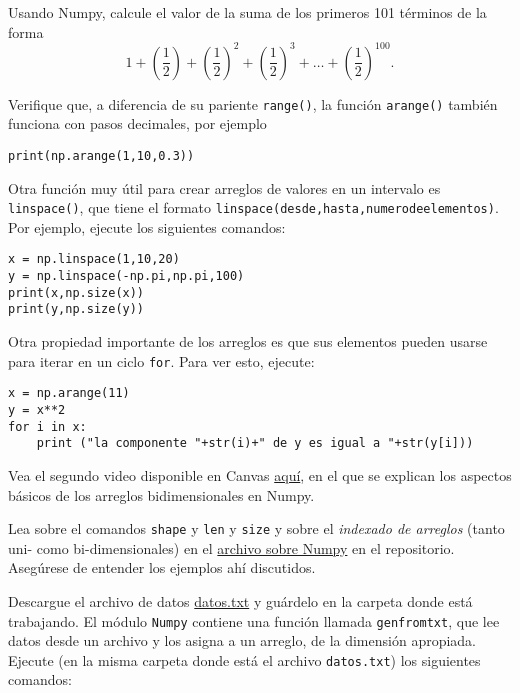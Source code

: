 \documentclass[11pt]{exam}
\begin{document}
\begin{questions}
\item Usando Numpy, calcule el valor de la suma de los primeros 101 términos de la forma
\begin{equation}
1+\left(\frac{1}{2}\right)+\left(\frac{1}{2}\right)^2+\left(\frac{1}{2}\right)^3+\dots +\left(\frac{1}{2}\right)^{100}.
\end{equation}
\item Verifique que, a diferencia de su pariente \texttt{range()}, la función \texttt{arange()} también funciona con pasos decimales, por ejemplo

\begin{verbatim}
print(np.arange(1,10,0.3))
\end{verbatim}

\item Otra función muy útil para crear arreglos de valores en un intervalo es \texttt{linspace()}, que tiene el formato \texttt{linspace(desde,hasta,numerodeelementos)}. Por ejemplo, ejecute los siguientes comandos:

\begin{verbatim}
x = np.linspace(1,10,20)
y = np.linspace(-np.pi,np.pi,100)
print(x,np.size(x))
print(y,np.size(y))
\end{verbatim}

\item Otra propiedad importante de los arreglos es que sus elementos pueden usarse para iterar en un ciclo \texttt{for}. Para ver esto, ejecute:

\begin{verbatim}
x = np.arange(11)
y = x**2
for i in x:
	print ("la componente "+str(i)+" de y es igual a "+str(y[i]))
\end{verbatim}

\item Vea el segundo video disponible en Canvas \href{https://udec.instructure.com/courses/51022/pages/numpy}{aquí}, en el que se explican los aspectos básicos de los arreglos bidimensionales en Numpy.
 
\item Lea sobre el comandos \texttt{shape} y \texttt{len} y \texttt{size} y sobre el\textit{ indexado de arreglos} (tanto uni- como bi-dimensionales) en el \href{https://github.com/gfrubi/CC/blob/master/Python/02-Numpy.ipynb}{archivo sobre Numpy} en el repositorio. Asegúrese de entender los ejemplos ahí discutidos.

\item Descargue el archivo de datos \href{https://udec.instructure.com/courses/51022/pages/numpy}{datos.txt} y guárdelo en la carpeta donde está trabajando. El módulo \texttt{Numpy} contiene una función llamada \texttt{genfromtxt}, que lee datos desde un archivo y los asigna a un arreglo, de la dimensión apropiada. Ejecute (en la misma carpeta donde está el archivo \texttt{datos.txt}) los siguientes comandos:


\end{questions}
\end{document}
